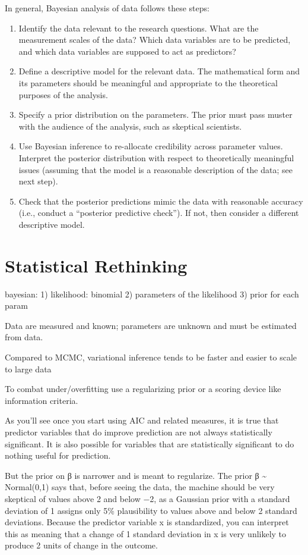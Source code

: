 \documentclass[]{book}
\begin{document}
In general, Bayesian analysis of data follows these steps:

\begin{enumerate}
\def\labelenumi{\arabic{enumi}.}
\item
  Identify the data relevant to the research questions. What are the
  measurement scales of the data? Which data variables are to be
  predicted, and which data variables are supposed to act as predictors?
\item
  Define a descriptive model for the relevant data. The mathematical
  form and its parameters should be meaningful and appropriate to the
  theoretical purposes of the analysis.
\item
  Specify a prior distribution on the parameters. The prior must pass
  muster with the audience of the analysis, such as skeptical
  scientists.
\item
  Use Bayesian inference to re-allocate credibility across parameter
  values. Interpret the posterior distribution with respect to
  theoretically meaningful issues (assuming that the model is a
  reasonable description of the data; see next step).
\item
  Check that the posterior predictions mimic the data with reasonable
  accuracy (i.e., conduct a ``posterior predictive check''). If not,
  then consider a different descriptive model.
\end{enumerate}

\section{Statistical Rethinking}\label{statistical-rethinking}

bayesian: 1) likelihood: binomial 2) parameters of the likelihood 3)
prior for each param

Data are measured and known; parameters are unknown and must be
estimated from data.

Compared to MCMC, variational inference tends to be faster and easier to
scale to large data

To combat under/overfitting use a regularizing prior or a scoring device
like information criteria.

As you'll see once you start using AIC and related measures, it is true
that predictor variables that do improve prediction are not always
statistically significant. It is also possible for variables that are
statistically significant to do nothing useful for prediction.

But the prior on β is narrower and is meant to regularize. The prior β
\textasciitilde{} Normal(0,1) says that, before seeing the data, the
machine should be very skeptical of values above 2 and below −2, as a
Gaussian prior with a standard deviation of 1 assigns only 5\%
plausibility to values above and below 2 standard deviations. Because
the predictor variable x is standardized, you can interpret this as
meaning that a change of 1 standard deviation in x is very unlikely to
produce 2 units of change in the outcome.
\end{document}
